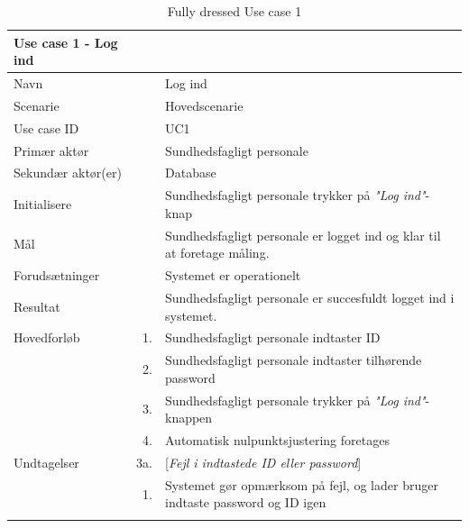 \begin{longtabu} to 
\toprule
    {\large \textbf{Use case 1 - Log ind}} && \\
    \toprule
    Navn &&    Log ind\\
    Scenarie &&    Hovedscenarie\\
    Use case ID &&    UC1\\
    Primær aktør &&    Sundhedsfagligt personale\\
    Sekundær aktør(er) &&    Database\\
    Initialisere &&    Sundhedsfagligt personale trykker på \textit{"Log ind"}-knap\\
    Mål &&    Sundhedsfagligt personale er logget ind og klar til at foretage måling.\\
    Forudsætninger &&    Systemet er operationelt\\
    Resultat &&    Sundhedsfagligt personale er succesfuldt logget ind i systemet.\\
    \toprule
    
    Hovedforløb &    1. &    Sundhedsfagligt personale indtaster ID\\[-1ex]
                &    2. &    Sundhedsfagligt personale indtaster tilhørende password\\[-1ex]
                &    3. &    Sundhedsfagligt personale trykker på \textit{"Log ind"}-knappen\\[-1ex]
                &	4.	&	Automatisk nulpunktsjustering foretages\\[-1ex]
                            
    \toprule
    Undtagelser &    3a. & [\textit{Fejl i indtastede ID eller password}] \\[-1ex]
    & 1. &  Systemet gør opmærksom på fejl, og lader bruger indtaste password og ID igen\\[-1ex]
                \toprule
   
\caption{Fully dressed Use case 1}
\label{UC1}
\end{longtabu}
\newpage


